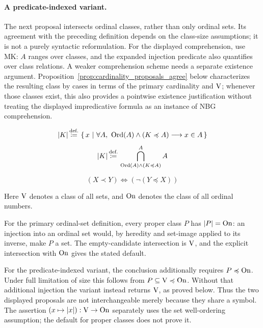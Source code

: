 \paragraph{A predicate-indexed variant.}
The next proposal intersects ordinal classes, rather than only ordinal sets.
Its agreement with the preceding definition depends on the class-size
assumptions; it is not a purely syntactic reformulation.
For the displayed comprehension, use MK: $A$ ranges over classes, and
the expanded injection predicate also quantifies over class relations.
A weaker comprehension scheme needs a separate existence argument.
Proposition~\ref{prop:cardinality_proposals_agree} below characterizes
the resulting class by cases in terms of the primary cardinality and
$\mathrm{V}$; whenever those classes exist, this also provides a pointwise
existence justification without treating the displayed impredicative
formula as an instance of NBG comprehension.
\begin{definition}[cardinality of a class]
\[
|K| \eqdef \cc{x}{\forall A,\ \Ord(A)\land (K\preccurlyeq A)\implies x\in A}
\]
\[
|K|
\,{\stackrel{{\textrm{def.}}}{\coloneqq}}\,
\bigcap^A_{\mathrm{Ord}(A)\land (K\preccurlyeq A)} A
\]
\end{definition}
\begin{definition}%
\[
(X\prec Y)
\iff
(\neg(Y \preccurlyeq X))
\]
\end{definition}

Here $\mathrm{V}$ denotes a class of all sets, and $\mathrm{On}$ denotes the class of all ordinal numbers.


\begin{remark}
For the primary ordinal-set definition, every proper class $P$ has
$|P|=\mathrm{On}$: an injection into an ordinal set would, by heredity and
set-image applied to its inverse, make $P$ a set. The empty-candidate
intersection is $\mathrm{V}$, and the explicit intersection with $\mathrm{On}$ gives
the stated default.

For the predicate-indexed variant, the conclusion additionally requires
$P\preccurlyeq\mathrm{On}$. Under full limitation of size this follows from
$P\subseteq\mathrm{V}\preccurlyeq\mathrm{On}$. Without that additional injection the
variant instead returns $\mathrm{V}$, as proved below. Thus the two displayed
proposals are not interchangeable merely because they share a symbol.
The assertion $(x\mapsto|x|):\mathrm{V}\to\mathrm{On}$ separately uses the set
well-ordering assumption; the default for proper classes does not prove it.
\end{remark}

